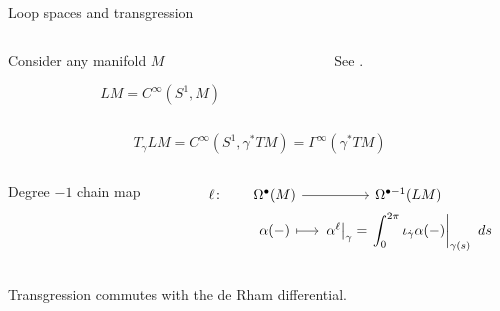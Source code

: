 \documentclass[handout,10pt]{beamer}
\begin{document}
  \begin{frame}[fragile]{Loop spaces and transgression}\label{frame:LoopSpacesTransgression}
		\begin{columns}
			\begin{column}[T]{0.5\textwidth}
				Consider any manifold $M$
				\begin{defblock}
					$$ LM = C^\infty(S^{1},M)	$$
				\end{defblock}
			\end{column}
			\begin{column}[T]{0.5\textwidth}		
				\begin{propblock}		
					See \cite{Brylinski1993}.
				\end{propblock}
			\end{column}
		\end{columns}
		
		\begin{defblock}
			\begin{displaymath}
				T_{\gamma}LM = C^\infty(S^{1},\gamma^{\ast}TM)= \Gamma^\infty(\gamma^\ast TM)	
			\end{displaymath}
		\end{defblock}

		\begin{defblock}[Trasgression]
			\begin{columns}
				\begin{column}[t]{0.35\textwidth}
					\centering
					Degree $-1$ chain map
				\end{column}
				\begin{column}{0.65\textwidth}
					\[
						\begin{tikzcd}[column sep= small,row sep=0ex]
					    \ell \colon& \Omega^{\bullet}(M) 	\arrow[r]& \Omega^{\bullet -1}(LM) \\
			  		  & \alpha (-)\arrow[r, mapsto]& 	\left.\alpha^{\ell} \right\vert_{\gamma} =
			    		\left.{\displaystyle\int^{2\pi}_{0} \iota_{\dot{\gamma}}\alpha(-)} \right\vert_{\gamma(s)} ~ ds
						\end{tikzcd}	
					\]
				\end{column}
			\end{columns}
		\end{defblock}

		\begin{propblock}
		Transgression commutes with the de Rham differential.
		\end{propblock}


\end{frame}
\end{document}
